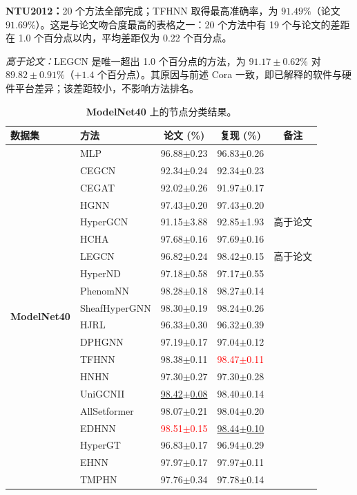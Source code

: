 \documentclass[11pt,a4paper]{article}
\begin{document}
\par\smallskip
\noindent\textbf{NTU2012：}20 个方法全部完成；TFHNN 取得最高准确率，为 $91.49\%$（论文 $91.69\%$）。这是与论文吻合度最高的表格之一：20 个方法中有 19 个与论文的差距在 1.0 个百分点以内，平均差距仅为 0.22 个百分点。

\noindent\textit{高于论文：}LEGCN 是唯一超出 1.0 个百分点的方法，为 $91.17\pm0.62\%$ 对 $89.82\pm0.91\%$（$+1.4$ 个百分点）。其原因与前述 Cora 一致，即已解释的软件与硬件平台差异；该差距较小，不影响方法排名。

\begin{table}[H]
	\centering\small
	\begin{tabular}{llccc}
		\toprule
		数据集 & 方法 & 论文 (\%) & 复现 (\%) & 备注 \\
		\midrule
		\multirow{20}{*}{\textbf{ModelNet40}} & MLP               & 96.88$\pm$0.23   & 96.83$\pm$0.26   &  \\
		 & CEGCN             & 92.34$\pm$0.24   & 92.34$\pm$0.23   &  \\
		 & CEGAT             & 92.02$\pm$0.26   & 91.97$\pm$0.17   &  \\
		 & HGNN              & 97.43$\pm$0.20   & 97.43$\pm$0.20   &  \\
		 & HyperGCN          & 91.15$\pm$3.88   & 92.85$\pm$1.93   & 高于论文 \\
		 & HCHA              & 97.68$\pm$0.16   & 97.69$\pm$0.16   &  \\
		 & LEGCN             & 96.82$\pm$0.24   & 98.42$\pm$0.15   & 高于论文 \\
		 & HyperND           & 97.18$\pm$0.58   & 97.17$\pm$0.55   &  \\
		 & PhenomNN          & 98.28$\pm$0.18   & 98.27$\pm$0.14   &  \\
		 & SheafHyperGNN     & 98.30$\pm$0.19   & 98.24$\pm$0.26   &  \\
		 & HJRL              & 96.33$\pm$0.30   & 96.32$\pm$0.39   &  \\
		 & DPHGNN            & 97.19$\pm$0.17   & 97.04$\pm$0.12   &  \\
		 & TFHNN             & 98.38$\pm$0.11   & \textcolor{red}{98.47$\pm$0.11}   &  \\
		 & HNHN              & 97.30$\pm$0.27   & 97.30$\pm$0.28   &  \\
		 & UniGCNII          & \underline{98.42$\pm$0.08}   & 98.40$\pm$0.14   &  \\
		 & AllSetformer      & 98.07$\pm$0.21   & 98.04$\pm$0.20   &  \\
		 & EDHNN             & \textcolor{red}{98.51$\pm$0.15}   & \underline{98.44$\pm$0.10}   &  \\
		 & HyperGT           & 96.83$\pm$0.17   & 96.94$\pm$0.29   &  \\
		 & EHNN              & 97.97$\pm$0.17   & 97.97$\pm$0.11   &  \\
		 & TMPHN             & 97.76$\pm$0.34   & 97.78$\pm$0.14   &  \\
		\bottomrule
	\end{tabular}
	\caption{\textbf{ModelNet40} 上的节点分类结果。}
\end{table}
\end{document}
